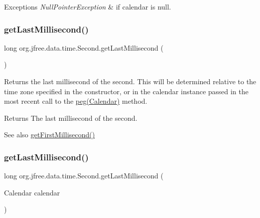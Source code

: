 \begin{DoxyExceptions}{Exceptions}
{\em Null\+Pointer\+Exception} & if {\ttfamily calendar} is {\ttfamily null}. \\
\hline
\end{DoxyExceptions}
\mbox{\label{classorg_1_1jfree_1_1data_1_1time_1_1_second_af026da0a956634a29ae3070dc955576e}} 
\subsubsection{\texorpdfstring{get\+Last\+Millisecond()}{getLastMillisecond()}\hspace{0.1cm}{\footnotesize\ttfamily [1/2]}}
{\footnotesize\ttfamily long org.\+jfree.\+data.\+time.\+Second.\+get\+Last\+Millisecond (\begin{DoxyParamCaption}{ }\end{DoxyParamCaption})}

Returns the last millisecond of the second. This will be determined relative to the time zone specified in the constructor, or in the calendar instance passed in the most recent call to the \mbox{\hyperlink{classorg_1_1jfree_1_1data_1_1time_1_1_second_a417846010aa3a4fd29e215dfcc0690a9}{peg(\+Calendar)}} method.

\begin{DoxyReturn}{Returns}
The last millisecond of the second.
\end{DoxyReturn}
\begin{DoxySeeAlso}{See also}
\mbox{\hyperlink{classorg_1_1jfree_1_1data_1_1time_1_1_second_a86421f4381011662af27c142e677e20b}{get\+First\+Millisecond()}} 
\end{DoxySeeAlso}
\mbox{\label{classorg_1_1jfree_1_1data_1_1time_1_1_second_a3ed4f173b2cf2a20c06ac0cc21092488}} 
\subsubsection{\texorpdfstring{get\+Last\+Millisecond()}{getLastMillisecond()}\hspace{0.1cm}{\footnotesize\ttfamily [2/2]}}
{\footnotesize\ttfamily long org.\+jfree.\+data.\+time.\+Second.\+get\+Last\+Millisecond (\begin{DoxyParamCaption}\item[{Calendar}]{calendar }\end{DoxyParamCaption})}

